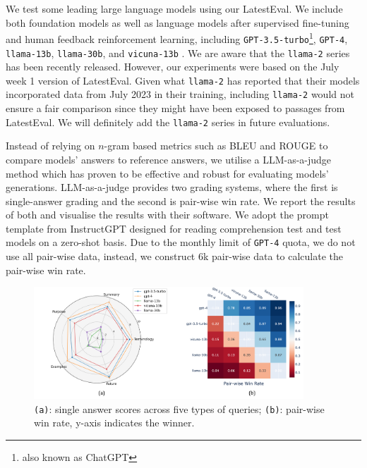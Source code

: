 \documentclass[letterpaper]{article} %
\begin{document}
We test some leading large language models using our LatestEval. We include both foundation models as well as language models after supervised fine-tuning and human feedback reinforcement learning, including \texttt{GPT-3.5-turbo}\footnote{also known as ChatGPT}, \texttt{GPT-4}, \texttt{llama-13b}, \texttt{llama-30b}, and \texttt{vicuna-13b} \cite{vicuna2023}. We are aware that the \texttt{llama-2} series has been recently released. However, our experiments were based on the July week 1 version of LatestEval. Given what \texttt{llama-2} has reported that their models incorporated data from July 2023 in their training, including \texttt{llama-2} would not ensure a fair comparison since they might have been exposed to passages from LatestEval. We will definitely add the \texttt{llama-2} series in future evaluations.

Instead of relying on $n$-gram based metrics such as BLEU and ROUGE to compare models' answers to reference answers, we utilise a LLM-as-a-judge method \cite{zheng2023judging} which has proven to be effective and robust for evaluating models' generations. LLM-as-a-judge provides two grading systems, where the first is single-answer grading and the second is pair-wise win rate. We report the results of both and visualise the results with their software. We adopt the prompt template from InstructGPT \cite{ouyang2022training} designed for reading comprehension test and test models on a zero-shot basis. 
Due to the monthly limit of \texttt{GPT-4} quota, we do not use all pair-wise data, instead, we construct 6k pair-wise data to calculate the pair-wise win rate.

\begin{figure}
    \centering
    \includegraphics[width=0.9\textwidth]{performance3.png}
    \caption{\texttt{(a)}: single answer scores across five types of queries; \texttt{(b)}: pair-wise win rate, y-axis indicates the winner. }
    \label{fig:performance}
\end{figure}
\end{document}
